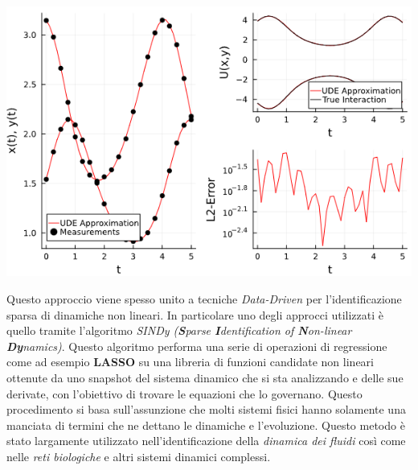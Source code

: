 \begin{minipage}{\linewidth}
    \centering
    \includegraphics[scale=0.7]{img/ude_approx.png}
    \label{fig:UDE_approx}
\end{minipage}

Questo approccio viene spesso unito a tecniche \emph{Data-Driven} \cite{datadrivendiffeq} per l'identificazione
sparsa di dinamiche non lineari. In particolare uno degli approcci utilizzati 
è quello tramite l'algoritmo \emph{SINDy (\textbf{S}parse \textbf{I}dentification of \textbf{N}on-linear \textbf{Dy}namics)}. 
Questo algoritmo performa una serie di operazioni di regressione come 
ad esempio \textbf{LASSO} su una libreria di funzioni candidate non lineari ottenute
da uno snapshot del sistema dinamico che si sta analizzando e delle sue derivate, 
con l'obiettivo di trovare le equazioni che lo governano. Questo procedimento 
si basa sull'assunzione che molti sistemi fisici hanno solamente una manciata di 
termini che ne dettano le dinamiche e l'evoluzione. Questo metodo è stato largamente
utilizzato nell'identificazione della \emph{dinamica dei fluidi} così come
nelle \emph{reti biologiche} e altri sistemi dinamici complessi.